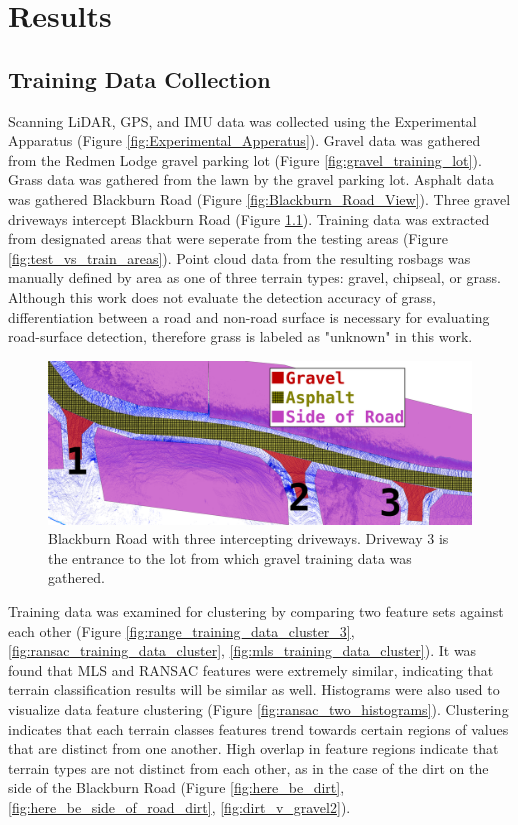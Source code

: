 \documentclass[numbered,pdftex]{ohio-etd}
\begin{document}
{{	} %

\chapter{Results}{
	
	\section{Training Data Collection}\label{sec:training-data-collection}{
	
		{Scanning LiDAR, GPS, and IMU data was collected using the Experimental Apparatus (Figure \ref{fig:Experimental_Apperatus}). Gravel data was gathered from the Redmen Lodge gravel parking lot (Figure \ref{fig:gravel_training_lot}). Grass data was gathered from the lawn by the gravel parking lot. Asphalt data was gathered Blackburn Road (Figure \ref{fig:Blackburn_Road_View}). Three gravel driveways intercept Blackburn Road (Figure \ref{fig:road_areas_annotated_2}). Training data was extracted from designated areas that were seperate from the testing areas (Figure \ref{fig:test_vs_train_areas}). Point cloud data from the resulting rosbags was manually defined by area as one of three terrain types: gravel, chipseal, or grass. Although this work does not evaluate the detection accuracy of grass, differentiation between a road and non-road surface is necessary for evaluating road-surface detection, therefore grass is labeled as "unknown" in this work.} 
		
		
		
		\begin{figure}[H]
			\centering
			\includegraphics[width=0.65\linewidth]{Defense_Images/road_areas_annotated_2}
			\caption[Blackburn Road Overlays]{Blackburn Road with three intercepting driveways. Driveway $3$ is the entrance to the lot from which gravel training data was gathered. }
			\label{fig:road_areas_annotated_2}
		\end{figure}

		{Training data was examined for clustering by comparing two feature sets against each other (Figure \ref{fig:range_training_data_cluster_3}, \ref{fig:ransac_training_data_cluster}, \ref{fig:mls_training_data_cluster}). It was found that MLS and RANSAC features were extremely similar, indicating that terrain classification results will be similar as well. Histograms were also used to visualize data feature clustering (Figure \ref{fig:ransac_two_histograms}). Clustering indicates that each terrain classes features trend towards certain regions of values that are distinct from one another. High overlap in feature regions indicate that terrain types are not distinct from each other, as in the case of the dirt on the side of the Blackburn Road (Figure \ref{fig:here_be_dirt}, \ref{fig:here_be_side_of_road_dirt}, \ref{fig:dirt_v_gravel2}). }
		
}}}
\end{document}
